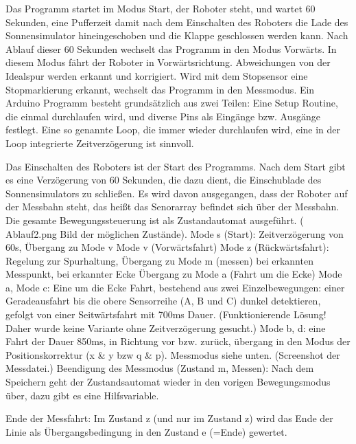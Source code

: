 \documentclass[a4paper,bibtotoc,oneside]{scrbook}
\begin{document}
Das Programm startet im Modus Start, der Roboter steht, und wartet 60 Sekunden, eine Pufferzeit damit nach dem Einschalten des Roboters die Lade des Sonnensimulator hineingeschoben und die Klappe geschlossen werden kann.
Nach Ablauf dieser 60 Sekunden wechselt das Programm in den Modus Vorwärts. In diesem Modus fährt der Roboter in Vorwärtsrichtung. Abweichungen von der Idealspur werden erkannt und korrigiert. Wird mit dem Stopsensor eine Stopmarkierung erkannt, wechselt das Programm in den Messmodus. 
Ein Arduino Programm besteht grundsätzlich aus zwei Teilen: 
Eine Setup Routine, die einmal durchlaufen wird, und diverse Pins als Eingänge bzw. Ausgänge festlegt.
Eine so genannte Loop, die immer wieder durchlaufen wird, eine in der Loop integrierte Zeitverzögerung ist sinnvoll. 

Das Einschalten des Roboters ist der Start des Programms. Nach dem Start gibt es eine Verzögerung von 60 Sekunden, die dazu dient, die Einschublade des Sonnensimulators zu schließen. Es wird davon ausgegangen, dass der Roboter auf der Messbahn steht, das heißt das Senorarray befindet sich über der Messbahn.
Die gesamte Bewegungssteuerung ist als Zustandautomat ausgeführt. ( Ablauf2.png Bild der möglichen Zustände).
Mode s (Start): Zeitverzögerung von 60s, Übergang zu Mode v
Mode v (Vorwärtsfahrt) Mode z (Rückwärtsfahrt): Regelung zur Spurhaltung, Übergang zu Mode m (messen) bei erkannten Messpunkt, bei erkannter Ecke Übergang zu Mode a (Fahrt um die Ecke)
Mode a, Mode c: Eine um die Ecke Fahrt, bestehend aus zwei Einzelbewegungen: einer Geradeausfahrt bis die obere Sensorreihe (A, B und C) dunkel detektieren, gefolgt von einer Seitwärtsfahrt mit 700ms Dauer. (Funktionierende Lösung! Daher wurde keine Variante ohne Zeitverzögerung gesucht.)
Mode b, d: eine Fahrt der Dauer 850ms, in Richtung vor bzw. zurück, übergang in den Modus der Positionskorrektur (x \& y bzw q \& p).
Messmodus siehe unten. (Screenshot der Messdatei.)
Beendigung des Messmodus (Zustand m, Messen): Nach dem Speichern geht der Zustandsautomat wieder in den vorigen Bewegungsmodus über, dazu gibt es eine Hilfsvariable.

Ende der Messfahrt: Im Zustand z (und nur im Zustand z) wird das Ende der Linie als Übergangsbedingung in den Zustand e (=Ende) gewertet. 
\end{document}
